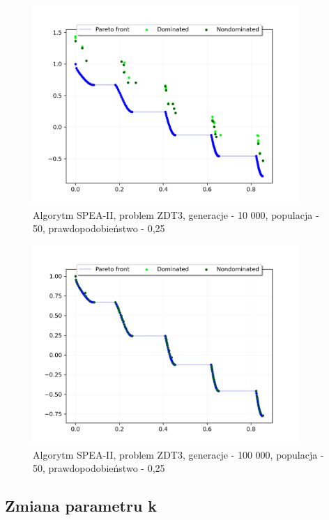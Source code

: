 \documentclass{classrep}
\begin{document}
\begin{figure}[H]
    \centering
    \includegraphics[width=0.9\textwidth]{img2/SPEAII_ZDT3_g10000_p50_r0,25.png}
    \caption{Algorytm SPEA-II, problem ZDT3, \newline generacje - 10 000, populacja - 50, prawdopodobieństwo - 0,25}
\end{figure}

\begin{figure}[H]
    \centering
    \includegraphics[width=0.9\textwidth]{img2/SPEAII_ZDT3_g100000_p50_r0,25.png}
    \caption{Algorytm SPEA-II, problem ZDT3, \newline generacje - 100 000, populacja - 50, prawdopodobieństwo - 0,25}
\end{figure}

\subsection{Zmiana parametru k}
\end{document}

